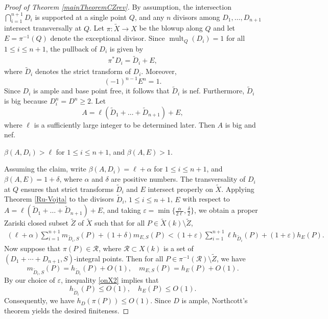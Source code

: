 \documentclass[10pt]{amsart}
\numberwithin{equation}{section}
\theoremstyle{plain}
\theoremstyle{definition}
\DeclareMathOperator{\mult}{mult}
\begin{document}
 \begin{proof}[Proof of Theorem \ref{mainTheoremCZrev}]
By assumption, the intersection 
$\bigcap_{i=1}^{n+1}D_i $
is supported at a single point $Q$, and 
   any $n$ divisors  among  $D_1, \ldots,D_{n+1}$ intersect  transversally at $Q$.
Let $\pi : \tilde{X}\to X$ be the blowup along $Q$ and let $E=\pi^{-1}(Q)$ denote the exceptional divisor.  
Since  $\mult_Q(D_i)=1$ for all $1\le i\le n+1$, the pullback of $D_i$ is given by 
 \begin{align}\label{pullbak}
\pi^*D_{i}=\tilde D_i+E ,
\end{align}
where $\tilde D_i$ denotes the strict transform of $D_i$.  
Moreover,  
$$
(-1)^{n-1}E^n=1.
$$
Since $D_i$ is ample and base point free, it follows that $\tilde D_i$ is nef.  Furthermore, $\tilde D_i$ is big because $D_i^n=D^n\ge 2$. 
Let 
$$
A=\ell(\tilde D_1+\hdots +\tilde D_{n+1})+E,
$$
where $\ell$ is a sufficiently large integer  to be determined later.  Then $A$ is big and nef.

\medskip

 $\beta(A,D_i)>\ell$ for $1\le i\le n+1$, and $\beta(A,E)>1$.

\medskip

Assuming the claim, write $\beta(A,D_i)=\ell+\alpha$ for $1\le i\le n+1$, and $\beta(A,E)=1+\delta$, where $\alpha$ and $\delta$ are positive numbers.  The transversality of $D_i$ at $Q$ ensures that strict transforms $\tilde{D}_i$ and $E$ intersect properly on $\tilde{X}$.  Applying  Theorem \ref{Ru-Vojta} to the divisors $\tilde D_i$, $1\le i\le n+1$, $E$ with respect to  $ A=\ell(\tilde D_1+\hdots +\tilde D_{n+1})+E$, and taking  $ \varepsilon =\min\{\frac{\alpha}{2\ell},  \frac{\delta}2\}$, we obtain a proper Zariski closed subset $\tilde Z$ of $\tilde  X$ such that for all $P\in \tilde X(k)\setminus \tilde Z$,
\begin{align}\label{onX2}
(\ell+\alpha)  \sum_{i=1}^{n+1}  m_{\tilde D_{i},S}(P)+  (1+\delta)m_{E,S}(P)
 <(1+ \varepsilon)  \sum_{i=1}^{n+1} \ell h_{\tilde D_{i}}(P)+(1+ \varepsilon) h_E(P).
\end{align}
Now suppose that $\pi(P)\in \mathcal R$, where $\mathcal R\subset X(k)$ is a set   of $(D_1+\cdots+D_{n+1},S)$-integral points.  Then  for all $ P\in \pi^{-1}(\mathcal R) \setminus \tilde Z$, we have
$$
m_{\tilde D_{i},S}(P)=  h_{\tilde D_{i}}(P)+O(1),\quad m_{E,S}(P)=  h_{E}(P) +O(1).
$$ 
 By our choice of $\varepsilon$, inequality \eqref{onX2} implies that 
$$
h_{\tilde D_{i}}(P) \le O(1),\quad h_{E}(P) \le O(1).
$$
  Consequently, we have $h_{D}(\pi(P)) \le O(1).$
Since $D$ is ample, Northcott's theorem yields the desired finiteness.


\end{proof}
\end{document}
